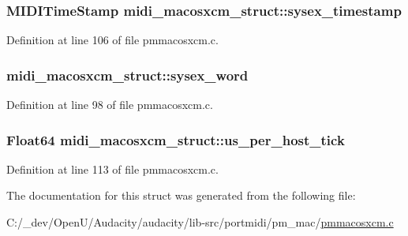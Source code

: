 \subsubsection[{\texorpdfstring{sysex\+\_\+timestamp}{sysex_timestamp}}]{\setlength{\rightskip}{0pt plus 5cm}M\+I\+D\+I\+Time\+Stamp midi\+\_\+macosxcm\+\_\+struct\+::sysex\+\_\+timestamp}\hypertarget{structmidi__macosxcm__struct_a2b40358acace8116d0a90afd4d783315}{}\label{structmidi__macosxcm__struct_a2b40358acace8116d0a90afd4d783315}


Definition at line 106 of file pmmacosxcm.\+c.

\subsubsection[{\texorpdfstring{sysex\+\_\+word}{sysex_word}}]{ midi\+\_\+macosxcm\+\_\+struct\+::sysex\+\_\+word}\hypertarget{structmidi__macosxcm__struct_aff87ee7b8382f84d5df8942b791cddbd}{}\label{structmidi__macosxcm__struct_aff87ee7b8382f84d5df8942b791cddbd}


Definition at line 98 of file pmmacosxcm.\+c.

\subsubsection[{\texorpdfstring{us\+\_\+per\+\_\+host\+\_\+tick}{us_per_host_tick}}]{\setlength{\rightskip}{0pt plus 5cm}Float64 midi\+\_\+macosxcm\+\_\+struct\+::us\+\_\+per\+\_\+host\+\_\+tick}\hypertarget{structmidi__macosxcm__struct_a2cc5977ceb33764ca22dd94263693437}{}\label{structmidi__macosxcm__struct_a2cc5977ceb33764ca22dd94263693437}


Definition at line 113 of file pmmacosxcm.\+c.



The documentation for this struct was generated from the following file\+:\begin{DoxyCompactItemize}
\item 
C\+:/\+\_\+dev/\+Open\+U/\+Audacity/audacity/lib-\/src/portmidi/pm\+\_\+mac/\hyperlink{pmmacosxcm_8c}{pmmacosxcm.\+c}\end{DoxyCompactItemize}

